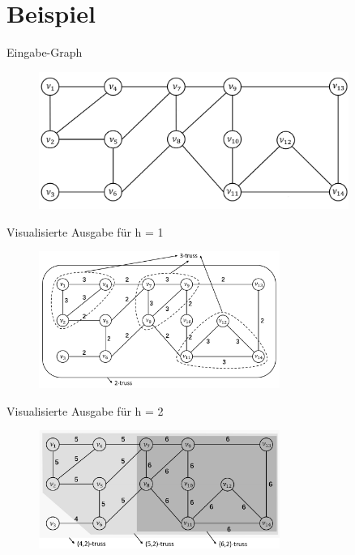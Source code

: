 \section{Beispiel}

\begin{frame}{Eingabe-Graph}
    \begin{figure}[h]
        \centering
        \includegraphics[width=0.9\textwidth]{imglib/Example-Graph-Initial}\\
        \label{fig:example-graph-initial}
    \end{figure}
\end{frame}

\begin{frame}{Visualisierte Ausgabe für h = 1}
    \begin{figure}[h]
        \centering
        \includegraphics[width=0.7\textwidth]{imglib/Example-Graph-Solution-1}\\
        \label{fig:example-graph-solution-1}
    \end{figure}
\end{frame}

\begin{frame}{Visualisierte Ausgabe für h = 2}
    \begin{figure}[h]
        \centering
        \includegraphics[width=0.7\textwidth]{imglib/Example-Graph-Solution-2}\\
        \label{fig:example-graph-solution-2}
    \end{figure}
\end{frame}